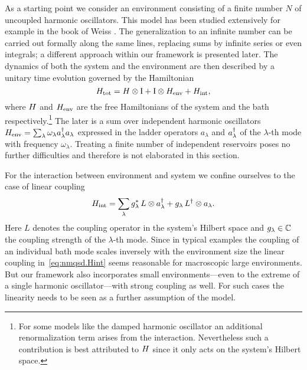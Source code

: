 As a starting point we consider an environment consisting of a finite number $N$ of uncoupled harmonic oscillators.
This model has been studied extensively for example in the book of Weiss \cite{We99_dissipative_systems}.
The generalization to an infinite number can be carried out formally along the same lines, replacing sums by infinite series or even integrals; a different approach within our framework is presented later.
The dynamics of both the system and the environment are then described by a unitary time evolution governed by the Hamiltonian
\begin{equation}
  H_\mathrm{tot} = H \otimes \mathrm{I}  +  \mathrm{I} \otimes H_\mathrm{env}  +  H_\mathrm{int},
  \label{eq:nmqsd.Htot}
\end{equation}
where $H$ and $H_\mathrm{env}$ are the free Hamiltonians of the system and the bath respectively.\footnote{For some models like the damped harmonic oscillator \cite{CaLe83_diss_system} an additional renormalization term arises from the interaction. Nevertheless such a contribution is best attributed to $H$ since it only acts on the system's Hilbert space.}
The later is a sum over independent harmonic oscillators $H_\mathrm{env} = \sum_\lambda \omega_\lambda a^\dagger_\lambda a_\lambda$ expressed in the ladder operators $a_\lambda$ and $a^\dagger_\lambda$ of the $\lambda$-th mode with frequency $\omega_\lambda$.
Treating a finite number of independent reservoirs poses no further difficulties and therefore is not elaborated in this section.

For the interaction between environment and system we confine ourselves to the case of linear coupling
\begin{equation}
  H_\mathrm{int} = \sum_\lambda {g}^*_\lambda \, L \otimes a^\dagger_\lambda + g_\lambda \, L^\dagger \otimes a_\lambda.
  \label{eq:nmqsd.Hint}
\end{equation}
Here $L$ denotes the coupling operator in the system's Hilbert space and $g_\lambda \in \mathbb{C}$ the coupling strength of the $\lambda$-th mode.
Since in typical examples the coupling of an individual bath mode scales inversely with the environment size \cite{We99_dissipative_systems} the linear coupling in~\ref{eq:nmqsd.Hint} seems reasonable for macroscopic large environments.
But our framework also incorporates small environments---even to the extreme of a single harmonic oscillator---with strong coupling as well.
For such cases the linearity needs to be seen as a further assumption of the model.

